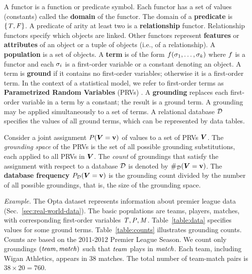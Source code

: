 \documentclass[conference]{IEEEtran}
\begin{document}
A functor is a function or predicate symbol. Each functor has a set of values (constants) called the \textbf{domain} of the functor. The domain of a \textbf{predicate} is $\{\mathit{T},\mathit{F}\}$. A predicate of arity at least two is a \textbf{relationship} functor. Relationship functors specify which objects are linked. Other functors represent \textbf{features} or \textbf{attributes} of an object or a tuple of objects (i.e., of a relationship).
A \textbf{population} is a set of objects. 
A \textbf{term} is of the form $f(\sigma_{1},\ldots,\sigma_{k})$ where $f$ is a functor %
and each $\sigma_{i}$ is a first-order variable or a constant denoting an object. A term is \textbf{ground} if it contains no first-order variables; otherwise it is a first-order term. In the context of a statistical model, we refer to first-order terms as \textbf{Parametrized Random Variables} (PRVs) \cite{Kimmig2014}. 
A \textbf{grounding} replaces each first-order variable in a term by a constant; the result is a ground term. A grounding may be applied simultaneously to a set of terms.  A relational database $\mathcal{D}$ specifies the values of all ground terms, which can be represented by data tables. 

Consider a joint assignment 
$P(\boldsymbol{V} = \mathbf{v})$ of values to a set of PRVs $\boldsymbol{V}$. The {\em grounding space} of the PRVs is the set of all possible grounding substitutions, each applied to all PRVs in $\boldsymbol{V}$. The {\em count} of groundings that satisfy the assignment with respect to a database $\mathcal{D}$ is denoted by $\#_{\mathcal{D}}(\boldsymbol{V} = \mathbf{v})$. The \textbf{database frequency} $P_{\mathcal{D}}(\boldsymbol{V} = \mathbf{v})$ is the grounding count divided by the number of all possible groundings, that is, the size of the grounding space.
		
\emph{Example.} \label{sec:example}
%
The Opta dataset represents information about premier league data %
(Sec.~\ref{sec:real-world-data}). 
The basic populations are teams, players, matches, with 
corresponding first-order variables $\it{T}, \it{P}, \it{M}$. Table~\ref{table:data} specifies values for some ground terms. Table~\ref{table:counts} illustrates grounding counts. Counts are based on the 2011-2012 Premier League Season. We count only groundings $(\it{team},\it{match})$ such that $\it{team}$ plays in $\it{match}$. Each team, including Wigan Athletics, appears in 38 matches. The total number of team-match pairs is $38 \times 20 = 760$.
\end{document}
